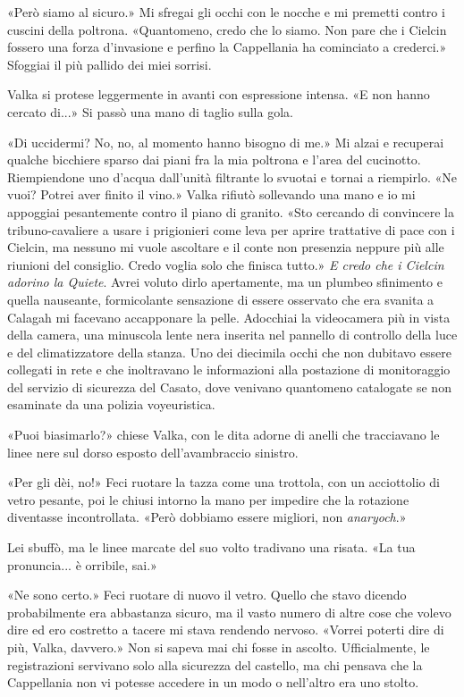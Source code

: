 «Però siamo al sicuro.» Mi sfregai gli occhi con le nocche e mi premetti
contro i cuscini della poltrona. «Quantomeno, credo che lo siamo. Non
pare che i Cielcin fossero una forza d'invasione e perfino la
Cappellania ha cominciato a crederci.» Sfoggiai il più pallido dei miei
sorrisi.

Valka si protese leggermente in avanti con espressione intensa. «E non
hanno cercato di...» Si passò una mano di taglio sulla gola.

«Di uccidermi? No, no, al momento hanno bisogno di me.» Mi alzai e
recuperai qualche bicchiere sparso dai piani fra la mia poltrona e
l'area del cucinotto. Riempiendone uno d'acqua dall'unità filtrante lo
svuotai e tornai a riempirlo. «Ne vuoi? Potrei aver finito il vino.»
Valka rifiutò sollevando una mano e io mi appoggiai pesantemente contro
il piano di granito. «Sto cercando di convincere la tribuno-cavaliere a
usare i prigionieri come leva per aprire trattative di pace con i
Cielcin, ma nessuno mi vuole ascoltare e il conte non presenzia neppure
più alle riunioni del consiglio. Credo voglia solo che finisca tutto.»
\emph{E credo che i Cielcin adorino la Quiete}. Avrei voluto dirlo
apertamente, ma un plumbeo sfinimento e quella nauseante, formicolante
sensazione di essere osservato che era svanita a Calagah mi facevano
accapponare la pelle. Adocchiai la videocamera più in vista della
camera, una minuscola lente nera inserita nel pannello di controllo
della luce e del climatizzatore della stanza. Uno dei diecimila occhi
che non dubitavo essere collegati in rete e che inoltravano le
informazioni alla postazione di monitoraggio del servizio di sicurezza
del Casato, dove venivano quantomeno catalogate se non esaminate da una
polizia voyeuristica.

«Puoi biasimarlo?» chiese Valka, con le dita adorne di anelli che
tracciavano le linee nere sul dorso esposto dell'avambraccio sinistro.

«Per gli dèi, no!» Feci ruotare la tazza come una trottola, con un
acciottolio di vetro pesante, poi le chiusi intorno la mano per impedire
che la rotazione diventasse incontrollata. «Però dobbiamo essere
migliori, non \emph{anaryoch}.»

Lei sbuffò, ma le linee marcate del suo volto tradivano una risata. «La
tua pronuncia... è orribile, sai.»

«Ne sono certo.» Feci ruotare di nuovo il vetro. Quello che stavo
dicendo probabilmente era abbastanza sicuro, ma il vasto numero di altre
cose che volevo dire ed ero costretto a tacere mi stava rendendo
nervoso. «Vorrei poterti dire di più, Valka, davvero.» Non si sapeva mai
chi fosse in ascolto. Ufficialmente, le registrazioni servivano solo
alla sicurezza del castello, ma chi pensava che la Cappellania non vi
potesse accedere in un modo o nell'altro era uno stolto.

